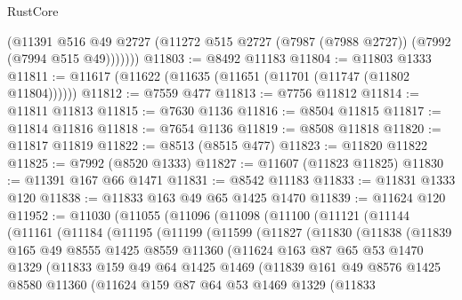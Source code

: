 \begin{lexlean}{RustCore}
\begin{coremodule}
          (@11391
            @516
            @49
            @2727
            (@11272 @515 @2727 (@7987 (@7988 @2727)) (@7992 (@7994 @515 @49)))))))
@11803 := @8492 @11183
@11804 := @11803 @1333
@11811 := @11617 (@11622 (@11635 (@11651 (@11701 (@11747 (@11802 @11804))))))
@11812 := @7559 @477
@11813 := @7756 @11812
@11814 := @11811 @11813
@11815 := @7630 @1136
@11816 := @8504 @11815
@11817 := @11814 @11816
@11818 := @7654 @1136
@11819 := @8508 @11818
@11820 := @11817 @11819
@11822 := @8513 (@8515 @477)
@11823 := @11820 @11822
@11825 := @7992 (@8520 @1333)
@11827 := @11607 (@11823 @11825)
@11830 := @11391 @167 @66 @1471
@11831 := @8542 @11183
@11833 := @11831 @1333 @120
@11838 := @11833 @163 @49 @65 @1425 @1470
@11839 := @11624 @120
@11952 := @11030
    (@11055
      (@11096
        (@11098
          (@11100
            (@11121
              (@11144
                (@11161
                  (@11184
                    (@11195
                      (@11199
                        (@11599
                          (@11827
                            (@11830
                              (@11838
                                (@11839
                                  @165
                                  @49
                                  @8555
                                  @1425
                                  @8559
                                  @11360
                                  (@11624
                                    @163
                                    @87
                                    @65
                                    @53
                                    @1470
                                    @1329
                                    (@11833
                                      @159
                                      @49
                                      @64
                                      @1425
                                      @1469
                                      (@11839
                                        @161
                                        @49
                                        @8576
                                        @1425
                                        @8580
                                        @11360
                                        (@11624
                                          @159
                                          @87
                                          @64
                                          @53
                                          @1469
                                          @1329
                                          (@11833

\end{coremodule}
\end{lexlean}
